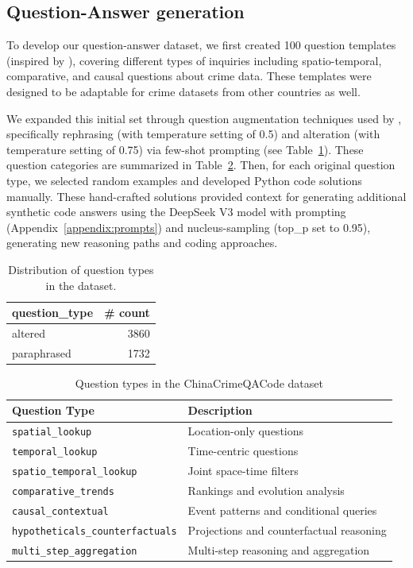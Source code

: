 \subsection{Question-Answer generation}

To develop our question-answer dataset, we first created 100 question templates (inspired by \citep{Dai2024QASTKG, Contractor2020QATourism}), covering different types of inquiries including spatio-temporal, comparative, and causal questions about crime data. These templates were designed to be adaptable for crime datasets from other countries as well.

We expanded this initial set through question augmentation techniques used by \cite{Yin2024MuMathCode, Li2024MuggleMath, Jain2024MetaFineTuning}, specifically rephrasing (with temperature setting of 0.5) and alteration (with temperature setting of 0.75) via few-shot prompting (see Table~\ref{tab:question_type_counts}). These question categories are summarized in Table~\ref{tab:question_types}. Then, for each original question type, we selected random examples and developed Python code solutions manually. These hand-crafted solutions provided context for generating additional synthetic code answers using the DeepSeek V3 model with prompting (Appendix~\ref{appendix:prompts}) and nucleus-sampling \citep{Holtzman2020NucleusSampling, Ahmad2025OCRNVidia, Nvidia2024KaggleMath} (top\_p set to 0.95), generating new reasoning paths and coding approaches.


\begin{table}[H]
\centering
\begin{tabular}{lr}
\hline
\textbf{question\_type} & \textbf{\# count} \\
\hline
altered     & 3860 \\
paraphrased & 1732 \\
\hline
\end{tabular}
\caption{Distribution of question types in the dataset.}
\label{tab:question_type_counts}
\end{table}

\begin{table}[H]
\centering
\caption{Question types in the ChinaCrimeQACode dataset}
\label{tab:question_types}
\begin{tabular}{ll}
\toprule
\textbf{Question Type} & \textbf{Description} \\
\midrule
\texttt{spatial\_lookup} & Location-only questions \\
\texttt{temporal\_lookup} & Time-centric questions \\
\texttt{spatio\_temporal\_lookup} & Joint space-time filters \\
\texttt{comparative\_trends} & Rankings and evolution analysis \\
\texttt{causal\_contextual} & Event patterns and conditional queries \\
\texttt{hypotheticals\_counterfactuals} & Projections and counterfactual reasoning \\
\texttt{multi\_step\_aggregation} & Multi-step reasoning and aggregation \\
\bottomrule
\end{tabular}
\end{table}



